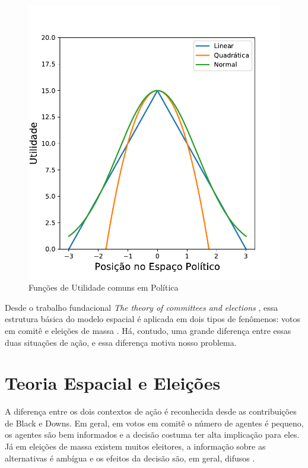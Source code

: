 \begin{figure}[H]
  \centering \includegraphics[scale = 0.6]{ims/utilities.pdf}
  \caption{Funções de Utilidade comuns em Política}
\end{figure}

Desde o trabalho fundacional \textit{The theory of committees and
  elections} \cite{black1958theory}, essa estrutura básica do modelo espacial é
aplicada em dois tipos de fenômenos: votos em comitê e eleições de massa
\cite{munger2015choosing}. Há, contudo, uma grande diferença entre essas duas
situações de ação, e essa diferença motiva nosso problema.


\section{Teoria Espacial e Eleições}


A diferença entre os dois contextos de ação é reconhecida desde as contribuições
de Black e Downs. Em geral, em votos em comitê o número de agentes é pequeno, os
agentes são bem informados e a decisão costuma ter alta implicação para eles. Já
em eleições de massa existem muitos eleitores, a informação sobre as
alternativas é ambígua e os efeitos da decisão são, em geral, difusos
\cite{munger2015choosing}.

